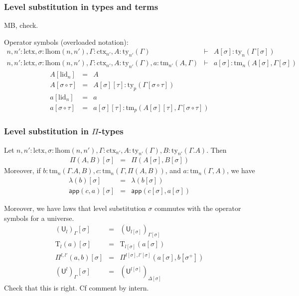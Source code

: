 \documentclass[11pt,a4paper]{article}
\theoremstyle{definition}
\newcommand{\UU}{\mathsf{U}}
\newcommand{\app}[2]{{#1\,#2}} %
\def\lhom{\mathrm{lhom}}
\def\UU{\mathsf{U}}
\def\lctx{\mathrm{lctx}}
\def\lid{\mathrm{lid}}
\newcommand{\ctx}{\mathrm{ctx}}
\newcommand{\ty}{\mathrm{ty}}
\newcommand{\tm}{\mathrm{tm}}
\def\app{\mathsf{app}}
\def\U{\mathsf{U}}
\newcommand{\Ta}{\mathrm{T}}
\begin{document}
\subsubsection{Level substitution in types and terms}

MB, check.

Operator symbols (overloaded notation):
\begin{eqnarray*}
n, n' : \lctx , \sigma : \lhom(n,n'), \Gamma : \ctx_{n'}, A:\ty_{n'}(\Gamma)
&\vdash& 
A[\sigma]: \ty_n(\Gamma[\sigma])\\
n,n' : \lctx , \sigma : \lhom(n,n'), \Gamma : \ctx_{n'}, A:\ty_{n'}(\Gamma), a : \tm_{n'}(A,\Gamma) 
&\vdash& 
a[\sigma] : \tm_{n}(A[\sigma],\Gamma[\sigma]) 
\end{eqnarray*}
\begin{eqnarray*}
A[\lid_n] &=& A\\
A[\sigma \circ \tau] &=& A[\sigma][\tau]: \ty_p(\Gamma[\sigma \circ \tau])\\
a[\lid_n] &=& a\\
a[\sigma \circ \tau] &=& a[\sigma][\tau]: \tm_p(A[\sigma][\tau],\Gamma[\sigma \circ \tau])
\end{eqnarray*}



\subsubsection{Level substitution in $\Pi$-types}

Let $n, n' : \lctx , \sigma : \lhom(n,n'), \Gamma : \ctx_{n'}, A:\ty_{n'}(\Gamma), B:\ty_{n'}(\Gamma.A)$. Then
\begin{eqnarray*}
\Pi(A,B)[\sigma] &=& \Pi(A[\sigma],B[\sigma])
\end{eqnarray*}
Moreover, if $b : \tm_n(\Gamma.A,B), c :  \tm_n(\Gamma,\Pi(A,B))$,  and $a : \tm_n(\Gamma,A)$, we have
\begin{eqnarray*}
\lambda(b)[\sigma] &=&\lambda(b[\sigma])\\
\app(c,a)[\sigma] &=&\app(c[\sigma],a[\sigma])
\end{eqnarray*}


Moreover, we have laws that level substitution $\sigma$ commutes with the operator symbols for a universe.
 \begin{eqnarray*}
 (\U_{l})_\Gamma[\sigma] &=& (\U_{l[\sigma]})_{\Gamma[\sigma]}\\
 \Ta_l(a) [ \sigma ] &=& \Ta_{l[\sigma]}(a[ \sigma ] )\\
\Pi^{l,l'}(a,b)[ \sigma ] &=& \Pi^{l[ \sigma ] ,l'[ \sigma ] }(a [ \sigma ], b[ \sigma^+ ])\\
(\UU^l)_\Gamma[ \sigma ] &=&(\UU^{l[ \sigma ]} )_{\Delta[ \sigma ]} 
 \end{eqnarray*}
Check that this is right. Cf comment by intern.
\end{document}
